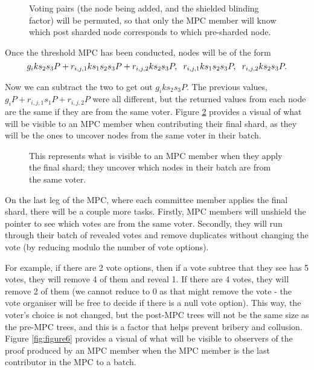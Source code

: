 \documentclass{article}
\begin{document}
\begin{figure}[h!]
        \centering
        
        \caption{Voting pairs (the node being added, and the shielded blinding factor) will be permuted, so that only the MPC member will know which post sharded node corresponds to which pre-sharded node.}
        \label{fig:figure4}
\end{figure}

Once the threshold MPC has been conducted, nodes will be of the form
$$ g_iks_2s_3P + r_{i,j,1}ks_1s_2s_3P + r_{i,j,2}ks_2s_3P, \hspace{2mm}r_{i,j,1}ks_1s_2s_3P, \hspace{2mm} r_{i,j,2}ks_2s_3P. $$

Now we can subtract the two to get out $g_iks_2s_3P$. The previous values, $g_iP + r_{i,j,1}s_1P + r_{i,j,2}P$ were all different, but the returned values from each node are the same if they are from the same voter. Figure \ref{fig:figure5} provides a visual of what will be visible to an MPC member when contributing their final shard, as they will be the ones to uncover nodes from the same voter in their batch.

\begin{figure}[h!]
        \centering
        
        \caption{This represents what is visible to an MPC member when they apply the final shard; they uncover which nodes in their batch are from the same voter.}
        \label{fig:figure5}
\end{figure}

On the last leg of the MPC, where each committee member applies the final shard, there will be a couple more tasks. Firstly, MPC members will unshield the pointer to see which votes are from the same voter. Secondly, they will run through their batch of revealed votes and remove duplicates without changing the vote (by reducing modulo the number of vote options).

For example, if there are 2 vote options, then if a vote subtree that they see has 5 votes, they will remove 4 of them and reveal 1. If there are 4 votes, they will remove 2 of them (we cannot reduce to 0 as that might remove the vote - the vote organiser will be free to decide if there is a null vote option). This way, the voter's choice is not changed, but the post-MPC trees will not be the same size as the pre-MPC trees, and this is a factor that helps prevent bribery and collusion. Figure \ref{fig:figure6} provides a visual of what will be visible to observers of the proof produced by an MPC member when the MPC member is the last contributor in the MPC to a batch.
\end{document}
